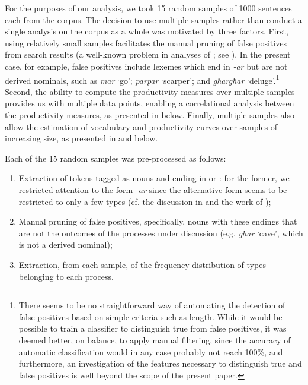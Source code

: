 \documentclass[output=paper]{LSP/langsci}
\begin{document}
For the purposes of our analysis, we took 15 random samples of 1000 sentences each from the corpus. The decision to use multiple samples rather than conduct a single analysis on the corpus as a whole was motivated by three factors. First, using relatively small samples facilitates the manual pruning of false positives from search results (a well-known problem in analyses of ; see \citealt{Pustylnikov2009}). In the present case, for example, false positives include lexemes which end in \textit{-ar} but are not derived nominals, such as \textit{mar} `go'; \textit{parpar} `scarper'; and \textit{għargħar} `deluge'.\footnote{There seems to be no straightforward way of automating the detection of false positives based on simple criteria such as length. While it would be possible to train a classifier to distinguish true from false positives, it was deemed better, on balance, to apply manual filtering, since the accuracy of automatic classification would in any case probably not reach 100\%, and furthermore, an investigation of the features necessary to distinguish true and false positives is well beyond the scope of the present paper.}
Second, the ability to compute the productivity measures over multiple samples provides us with multiple data points, enabling a correlational analysis between the productivity measures, as presented in  below. Finally, multiple samples also allow the estimation of vocabulary and productivity curves over samples of increasing size, as presented in  and  below.

\newpage 
Each of the 15 random samples was pre-processed as follows:

\begin{enumerate}
\item Extraction of tokens tagged as nouns and ending in {\ar} or \zjoni: for the former, we restricted attention to the form \textit{-ār} since the alternative form seems to be restricted to only a few types (cf. the discussion in  and the work of \citealt{Camilleri1993});
\item Manual pruning of false positives, specifically, nouns with these endings that are not the outcomes of the  processes under discussion (e.g. \textit{għar} `cave', which is not a derived nominal);
\item Extraction, from each sample, of the frequency distribution of types belonging to each process.
\end{enumerate}
\end{document}
